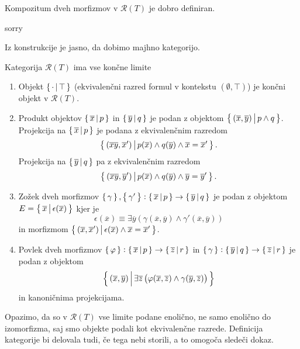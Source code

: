 \documentclass[../kategoricna_logika.tex]{subfiles}
\begin{document}
\begin{lema}
  Kompozitum dveh morfizmov v $\mathcal{R}(T)$ je dobro definiran.
\end{lema}
\begin{dokaz}
  sorry
\end{dokaz}
Iz konstrukcije je jasno, da dobimo majhno kategorijo.
\begin{lema}
  Kategorija $\mathcal{R}(T)$ ima vse končne limite
  \begin{enumerate}[label=(\roman*)]
    \item Objekt $\left\lbrace\,\cdot \,\middle|\, \top\,\right\rbrace$ (ekvivalenčni razred formul v kontekstu $(\emptyset, \top)$) je končni objekt v $\mathcal{R}(T)$.
    \item Produkt objektov $\left\lbrace\,\overline{x}\,\middle|\, p\,\right\rbrace$ in $\left\lbrace\,\overline{y}\,\middle|\, q\,\right\rbrace$ je podan z objektom
      $\left\lbrace\,(\overline{x},\overline{y})\,\middle|\, p \wedge q\,\right\rbrace$.
      Projekcija na $\left\lbrace\,\overline{x}\,\middle|\, p\,\right\rbrace$ je podana z ekvivalenčnim  razredom 
      $$\left\lbrace\,(\overline{x}\overline{y},\overline{x}')\,\middle|\, p(\overline{x}) \wedge q(\overline{y}) \wedge \overline{x} = \overline{x}'\,\right\rbrace.$$
      Projekcija na $\left\lbrace\,\overline{y}\,\middle|\, q\,\right\rbrace$ pa z ekvivalenčnim razredom
      $$\left\lbrace\,(\overline{x}\overline{y},\overline{y}')\,\middle|\, p(\overline{x}) \wedge q(\overline{y}) \wedge \overline{y} = \overline{y}'\,\right\rbrace.$$
    \item Zožek dveh morfizmov $\left\lbrace\,\gamma\,\right\rbrace, \left\lbrace\,\gamma'\,\right\rbrace : \left\lbrace\,\overline{x}\,\middle|\, p\,\right\rbrace \to \left\lbrace\,\overline{y}\,\middle|\, q\,\right\rbrace$
      je podan z objektom $E = \left\lbrace\,\overline{x}\,\middle|\, \epsilon(\overline{x})\,\right\rbrace$ kjer je 
      $$\epsilon(\overline{x}) \equiv \exists \overline{y}\left(\gamma(\overline{x},\overline{y}) \wedge \gamma'(\overline{x},\overline{y})\right)$$
      in morfizmom $\left\lbrace\,(\overline{x},\overline{x}')\,\middle|\, \epsilon(\overline{x}) \wedge \overline{x} = \overline{x}'\,\right\rbrace$.
    \item Povlek dveh morfizmov $\left\lbrace\,\varphi\,\right\rbrace : \left\lbrace\,\overline{x}\,\middle|\, p\,\right\rbrace \to  \left\lbrace\,\overline{z}\,\middle|\, r\,\right\rbrace$ in $\left\lbrace\,\gamma\,\right\rbrace : \left\lbrace\,\overline{y}\,\middle|\, q\,\right\rbrace \to \left\lbrace\,\overline{z}\,\middle|\, r\,\right\rbrace$
      je podan z objektom 
      $$\left\lbrace\,(\overline{x},\overline{y})\,\middle|\, \exists \overline{z} \left(\varphi(\overline{x},\overline{z}) \wedge \gamma(\overline{y},\overline{z})\right)\,\right\rbrace$$
      in kanoničnima projekcijama.
  \end{enumerate}
\end{lema}
\begin{opomba}
  Opazimo, da so v $\mathcal{R}(T)$ vse limite podane enolično, ne samo enolično do izomorfizma,
  saj smo objekte podali kot ekvivalenčne razrede. Definicija kategorije bi delovala tudi, če tega nebi storili, a to omogoča sledeči dokaz.
\end{opomba}
\end{document}
